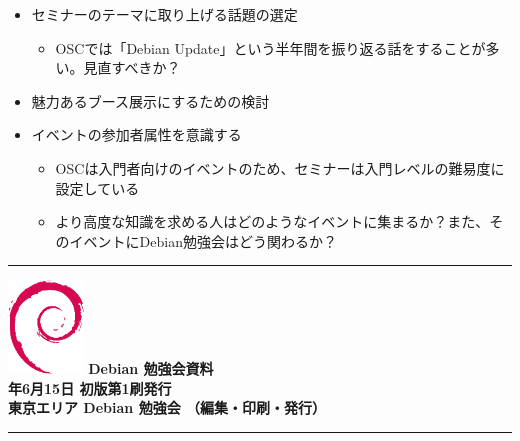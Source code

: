 \documentclass[mingoth,a4paper]{jsarticle}
\newcommand{\debmtgyear}{2019}
\newcommand{\debmtgmonth}{6}
\newcommand{\debmtgdate}{15}
\begin{document}
\begin{itemize}
\item セミナーのテーマに取り上げる話題の選定
  \begin{itemize}
  \item OSCでは「Debian Update」という半年間を振り返る話をすることが多い。見直すべきか？
  \end{itemize}
\item 魅力あるブース展示にするための検討
\item イベントの参加者属性を意識する
  \begin{itemize}
  \item OSCは入門者向けのイベントのため、セミナーは入門レベルの難易度に設定している
  \item より高度な知識を求める人はどのようなイベントに集まるか？また、そのイベントにDebian勉強会はどう関わるか？
  \end{itemize}
\end{itemize}


\mbox{}\newpage

\vspace*{15cm}
\hrule
\vspace{2mm}
\includegraphics[width=2cm]{image200502/openlogo-nd.eps}
\noindent \Large \bf Debian 勉強会資料\\
\noindent \normalfont \debmtgyear{}年\debmtgmonth{}月\debmtgdate{}日 \hspace{5mm}  初版第1刷発行\\
\noindent \normalfont 東京エリア Debian 勉強会 （編集・印刷・発行）\\
\hrule
\end{document}
